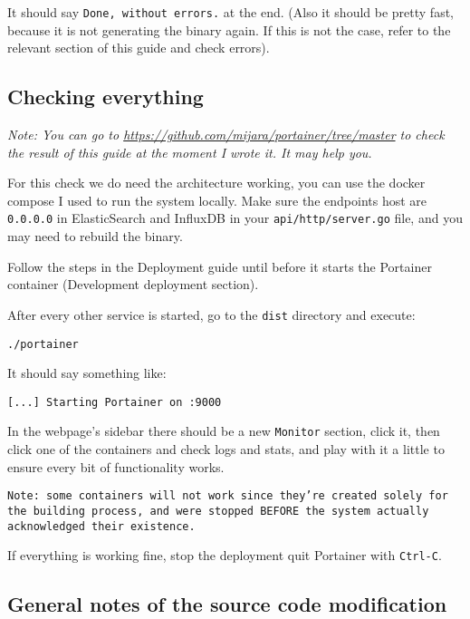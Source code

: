 It should say \texttt{Done, without errors.} at the end. (Also it should be pretty fast, because it is not generating the binary again. If this is not the case, refer to the relevant section of this guide and check errors).

\subsection{Checking everything}

\begin{center}
\textit{Note: You can go to \url{https://github.com/mijara/portainer/tree/master} to check the result of this guide at the moment I wrote it. It may help you.}
\end{center}

For this check we do need the architecture working, you can use the docker  compose I used to run the system locally. Make sure the endpoints host are \texttt{0.0.0.0} in ElasticSearch and InfluxDB in your \texttt{api/http/server.go} file, and you may need to rebuild the binary.

Follow the steps in the Deployment guide until before it starts the Portainer container (Development deployment section).

After every other service is started, go to the \texttt{dist} directory and execute:

\begin{lstlisting}
./portainer
\end{lstlisting}

It should say something like:

\begin{lstlisting}
[...] Starting Portainer on :9000
\end{lstlisting}

In the webpage's sidebar there should be a new \texttt{Monitor} section, click it, then click one of the containers and check logs and stats, and play with it a little to ensure every bit of functionality works.

\begin{center}
\texttt{Note: some containers will not work since they're created solely for the building process, and were stopped BEFORE the system actually acknowledged their existence.}
\end{center}

If everything is working fine, stop the deployment quit Portainer with \texttt{Ctrl-C}.

\subsection{General notes of the source code modification}

